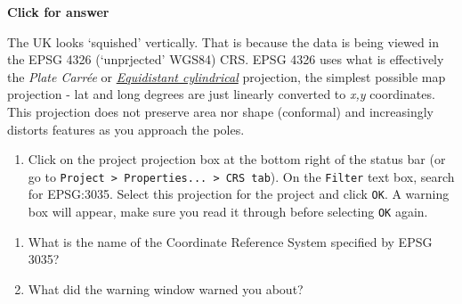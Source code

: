 \documentclass[
  letterpaper,
  DIV=11,
  numbers=noendperiod]{scrreprt}
\providecommand{\tightlist}{%
  \setlength{\itemsep}{0pt}\setlength{\parskip}{0pt}}\usepackage{longtable,booktabs,array}
\begin{document}
\begin{tcolorbox}[enhanced jigsaw, leftrule=.75mm, colframe=quarto-callout-important-color-frame, breakable, toprule=.15mm, bottomrule=.15mm, arc=.35mm, rightrule=.15mm, opacityback=0, colback=white, left=2mm]

\vspace{-3mm}\textbf{Click for answer}\vspace{3mm}

The UK looks `squished' vertically. That is because the data is being
viewed in the EPSG 4326 (`unprjected' WGS84) CRS. EPSG 4326 uses what is
effectively the \emph{Plate Carrée} or
\href{https://proj.org/en/9.4/operations/projections/eqc.html}{\emph{Equidistant
cylindrical}} projection, the simplest possible map projection - lat and
long degrees are just linearly converted to \emph{x,y} coordinates. This
projection does not preserve area nor shape (conformal) and increasingly
distorts features as you approach the poles.

\end{tcolorbox}

\begin{enumerate}
\def\labelenumi{(\arabic{enumi})}
\setcounter{enumi}{56}
\tightlist
\item
  Click on the project projection box at the bottom right of the status
  bar (or go to
  \texttt{Project\ \textgreater{}\ Properties...\ \textgreater{}\ CRS\ tab}).
  On the \texttt{Filter} text box, search for EPSG:3035. Select this
  projection for the project and click \texttt{OK}. A warning box will
  appear, make sure you read it through before selecting \texttt{OK}
  again.
\end{enumerate}

\begin{tcolorbox}[enhanced jigsaw, breakable, toptitle=1mm, colback=white, left=2mm, leftrule=.75mm, titlerule=0mm, colframe=quarto-callout-important-color-frame, opacityback=0, title=\textcolor{quarto-callout-important-color}{\faExclamation}\hspace{0.5em}{Stop and Think}, toprule=.15mm, opacitybacktitle=0.6, bottomtitle=1mm, colbacktitle=quarto-callout-important-color!10!white, bottomrule=.15mm, coltitle=black, rightrule=.15mm, arc=.35mm]

\begin{enumerate}
\def\labelenumi{\alph{enumi})}
\item
  What is the name of the Coordinate Reference System specified by EPSG
  3035?
\item
  What did the warning window warned you about?
\end{enumerate}

\end{tcolorbox}
\end{document}
